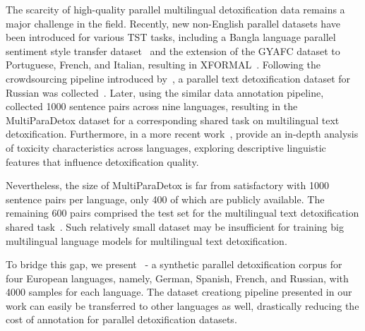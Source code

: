 The scarcity of high-quality parallel multilingual detoxification data remains a major challenge in the field. Recently, new non-English parallel datasets have been introduced for various TST tasks, including a Bangla language parallel sentiment style transfer dataset~\cite{mukherjee-etal-2023-low} and the extension of the GYAFC dataset to Portuguese, French, and Italian, resulting in XFORMAL~\cite{DBLP:conf/naacl/BriakouLZT21}. Following the crowdsourcing pipeline introduced by~\cite{DBLP:conf/acl/LogachevaDUMDKS22}, a parallel text detoxification dataset for Russian was collected~\cite{DBLP:journals/corr/abs-2206-02252}. Later, using the similar data annotation pipeline,~\citet{DBLP:conf/clef/DementievaMBAR024} collected 1000 sentence pairs across nine languages, resulting in the MultiParaDetox dataset for a corresponding shared task on multilingual text detoxification. Furthermore, in a more recent work~\citet{DBLP:conf/coling/DementievaBRAR025}, provide an in-depth analysis of toxicity characteristics across languages, exploring descriptive linguistic features that influence detoxification quality.

Nevertheless, the size of MultiParaDetox is far from satisfactory with 1000 sentence pairs per language, only 400 of which are publicly available. The remaining 600 pairs comprised the test set for the multilingual text detoxification shared task~\cite{DBLP:conf/clef/DementievaMBAR024}. Such relatively small dataset may be insufficient for training big multilingual language models for multilingual text detoxification.

To bridge this gap, we present \dataset~- a synthetic parallel detoxification corpus for four European languages, namely, German, Spanish, French, and Russian, with 4000 samples for each language. The dataset creationg pipeline presented in our work can easily be transferred to other languages as well, drastically reducing the cost of annotation for parallel detoxification datasets.